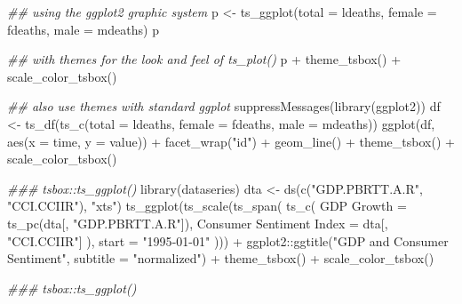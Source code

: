 \documentclass[
  letterpaper,
  DIV=11,
  numbers=noendperiod]{scrreport}
\newenvironment{Shaded}{\begin{snugshade}}{\end{snugshade}}
\newcommand{\AttributeTok}[1]{\textcolor[rgb]{0.40,0.45,0.13}{#1}}
\newcommand{\DocumentationTok}[1]{\textcolor[rgb]{0.37,0.37,0.37}{\textit{#1}}}
\newcommand{\FunctionTok}[1]{\textcolor[rgb]{0.28,0.35,0.67}{#1}}
\newcommand{\NormalTok}[1]{\textcolor[rgb]{0.00,0.23,0.31}{#1}}
\newcommand{\OtherTok}[1]{\textcolor[rgb]{0.00,0.23,0.31}{#1}}
\newcommand{\SpecialCharTok}[1]{\textcolor[rgb]{0.37,0.37,0.37}{#1}}
\newcommand{\StringTok}[1]{\textcolor[rgb]{0.13,0.47,0.30}{#1}}
\begin{document}
\begin{Shaded}
\begin{Highlighting}[]
\DocumentationTok{\#\# using the ggplot2 graphic system}
\NormalTok{p }\OtherTok{\textless{}{-}} \FunctionTok{ts\_ggplot}\NormalTok{(}\AttributeTok{total =}\NormalTok{ ldeaths, }\AttributeTok{female =}\NormalTok{ fdeaths, }\AttributeTok{male =}\NormalTok{ mdeaths)}
\NormalTok{p}

\DocumentationTok{\#\# with themes for the look and feel of ts\_plot()}
\NormalTok{p }\SpecialCharTok{+} \FunctionTok{theme\_tsbox}\NormalTok{() }\SpecialCharTok{+} \FunctionTok{scale\_color\_tsbox}\NormalTok{()}

\DocumentationTok{\#\# also use themes with standard ggplot}
\FunctionTok{suppressMessages}\NormalTok{(}\FunctionTok{library}\NormalTok{(ggplot2))}
\NormalTok{df }\OtherTok{\textless{}{-}} \FunctionTok{ts\_df}\NormalTok{(}\FunctionTok{ts\_c}\NormalTok{(}\AttributeTok{total =}\NormalTok{ ldeaths, }\AttributeTok{female =}\NormalTok{ fdeaths, }\AttributeTok{male =}\NormalTok{ mdeaths))}
\FunctionTok{ggplot}\NormalTok{(df, }\FunctionTok{aes}\NormalTok{(}\AttributeTok{x =}\NormalTok{ time, }\AttributeTok{y =}\NormalTok{ value)) }\SpecialCharTok{+}
  \FunctionTok{facet\_wrap}\NormalTok{(}\StringTok{"id"}\NormalTok{) }\SpecialCharTok{+}
  \FunctionTok{geom\_line}\NormalTok{() }\SpecialCharTok{+}
  \FunctionTok{theme\_tsbox}\NormalTok{() }\SpecialCharTok{+}
  \FunctionTok{scale\_color\_tsbox}\NormalTok{()}


\DocumentationTok{\#\#\# tsbox::ts\_ggplot()}
\FunctionTok{library}\NormalTok{(dataseries)}
\NormalTok{dta }\OtherTok{\textless{}{-}} \FunctionTok{ds}\NormalTok{(}\FunctionTok{c}\NormalTok{(}\StringTok{"GDP.PBRTT.A.R"}\NormalTok{, }\StringTok{"CCI.CCIIR"}\NormalTok{), }\StringTok{"xts"}\NormalTok{)}
\FunctionTok{ts\_ggplot}\NormalTok{(}\FunctionTok{ts\_scale}\NormalTok{(}\FunctionTok{ts\_span}\NormalTok{(}
  \FunctionTok{ts\_c}\NormalTok{(}
    \StringTok{\textasciigrave{}}\AttributeTok{GDP Growth}\StringTok{\textasciigrave{}} \OtherTok{=} \FunctionTok{ts\_pc}\NormalTok{(dta[, }\StringTok{"GDP.PBRTT.A.R"}\NormalTok{]),}
    \StringTok{\textasciigrave{}}\AttributeTok{Consumer Sentiment Index}\StringTok{\textasciigrave{}} \OtherTok{=}\NormalTok{ dta[, }\StringTok{"CCI.CCIIR"}\NormalTok{]}
\NormalTok{  ),}
  \AttributeTok{start =} \StringTok{"1995{-}01{-}01"}
\NormalTok{))) }\SpecialCharTok{+}
\NormalTok{  ggplot2}\SpecialCharTok{::}\FunctionTok{ggtitle}\NormalTok{(}\StringTok{"GDP and Consumer Sentiment"}\NormalTok{, }\AttributeTok{subtitle =} \StringTok{"normalized"}\NormalTok{) }\SpecialCharTok{+}
  \FunctionTok{theme\_tsbox}\NormalTok{() }\SpecialCharTok{+}
  \FunctionTok{scale\_color\_tsbox}\NormalTok{()}

\DocumentationTok{\#\#\# tsbox::ts\_ggplot()}
\end{Highlighting}
\end{Shaded}
\end{document}
